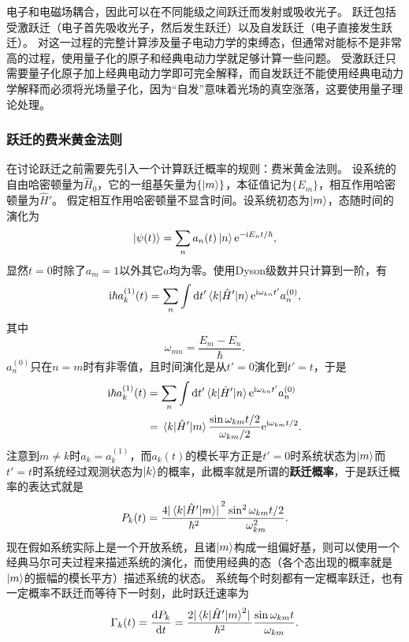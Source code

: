 \documentclass[UTF8, a4paper]{ctexart}
\newcommand*{\ee}{\mathrm{e}}
\newcommand*{\ii}{\mathrm{i}}
\renewcommand*{\dd}{\mathop{}\!\mathrm{d}}
\begin{document}
电子和电磁场耦合，因此可以在不同能级之间跃迁而发射或吸收光子。
跃迁包括受激跃迁（电子首先吸收光子，然后发生跃迁）以及自发跃迁（电子直接发生跃迁）。
对这一过程的完整计算涉及量子电动力学的束缚态，但通常对能标不是非常高的过程，使用量子化的原子和经典电动力学就足够计算一些问题。
受激跃迁只需要量子化原子加上经典电动力学即可完全解释，而自发跃迁不能使用经典电动力学解释而必须将光场量子化，因为“自发”意味着光场的真空涨落，这要使用量子理论处理。

\subsubsection{跃迁的费米黄金法则}

在讨论跃迁之前需要先引入一个计算跃迁概率的规则：费米黄金法则。
设系统的自由哈密顿量为$\hat{H}_0$，它的一组基矢量为$\{\ket{m}\}$，本征值记为$\{E_m\}$，相互作用哈密顿量为$\hat{H}'$。
假定相互作用哈密顿量不显含时间。设系统初态为$\ket{m}$，态随时间的演化为
\[
    \ket{\psi(t)} = \sum_n a_n(t) \ket{n} \ee^{- \ii E_n t / \hbar},
\]
显然$t=0$时除了$a_m=1$以外其它$a$均为零。使用Dyson级数并只计算到一阶，有
\[
    \ii \hbar a^{(1)}_k(t) = \sum_n \int \dd{t'} \mel{k}{\hat{H}'}{n} \ee^{\ii \omega_{kn} t'} a_n^{(0)},
\]
其中
\[
    \omega_{mn} = \frac{E_m - E_n}{\hbar}.
\]
$a_n^{(0)}$只在$n=m$时有非零值，且时间演化是从$t'=0$演化到$t'=t$，于是
\[
    \begin{aligned}
        \ii \hbar a^{(1)}_k(t) &= \sum_n \int \dd{t'} \mel{k}{\hat{H}'}{n} \ee^{\ii \omega_{kn} t'} a_n^{(0)} \\
        &= \mel{k}{\hat{H}'}{m} \frac{\sin \omega_{km} t / 2}{\omega_{km} / 2} \ee^{\ii \omega_{km} t / 2}. 
    \end{aligned}
\]
注意到$m \neq k$时$a_k = a_k^{(1)}$，而$a_k(t)$的模长平方正是$t'=0$时系统状态为$\ket{m}$而$t'=t$时系统经过观测状态为$\ket{k}$的概率，此概率就是所谓的\textbf{跃迁概率}，于是跃迁概率的表达式就是
\begin{equation}
    P_k(t) = \frac{4 \abs*{\mel{k}{\hat{H}'}{m}}^2}{\hbar^2} \frac{\sin^2 \omega_{km} t / 2}{\omega_{km}^2}.
\end{equation}
现在假如系统实际上是一个开放系统，且诸$\ket{m}$构成一组偏好基，则可以使用一个经典马尔可夫过程来描述系统的演化，而使用经典的态（各个态出现的概率就是$\ket{m}$的振幅的模长平方）描述系统的状态。
系统每个时刻都有一定概率跃迁，也有一定概率不跃迁而等待下一时刻，此时跃迁速率为
\begin{equation}
    \Gamma_k(t) = \dv{P_k}{t} = \frac{2 \abs*{\mel{k}{\hat{H}'}{m}^2}}{\hbar^2} \frac{\sin \omega_{km} t}{\omega_{km}}.
\end{equation}
\end{document}
